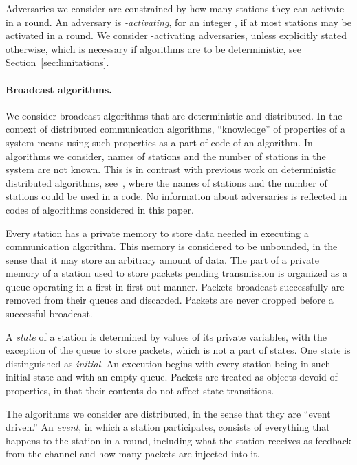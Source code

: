 \documentclass[11pt]{article}
\newcommand{\BBB}{\vspace*{-\bigskipamount}}
\newcommand{\Paragraph}[1]{\BBB\paragraph{#1}}
\begin{document}
Adversaries we consider are constrained by how many stations they can activate in a round.
An adversary is \emph{-activating}, for an integer , if at most  stations may be activated in a round.
We consider -activating adversaries, unless explicitly stated otherwise, which is necessary if algorithms are to be deterministic, see Section~\ref{sec:limitations}.




\Paragraph{Broadcast algorithms.}




We consider  broadcast algorithms that are deterministic and distributed.
In the context of distributed communication algorithms,  ``knowledge'' of properties of a system means using such properties as a part of code of an algorithm.
In algorithms we consider, names of stations and the number of stations in the system are not known.
This is in contrast with previous work on deterministic distributed algorithms, see~\cite{AnantharamuCKR-INFOCOM10, AnantharamuCKR-SIROCCO11, AnantharamuCR-OPODIS09, ChlebusKR09, ChlebusKR-TALG12}, where the names of stations and the number of stations could be used in a code.
No information about adversaries is reflected in codes of algorithms considered in this paper.



Every station has a private memory to store data needed in executing a communication algorithm.
This memory is considered to be unbounded, in the sense that it may store an arbitrary amount of data.
The part of a private memory of a station used to store packets pending transmission is organized as a queue operating  in a first-in-first-out manner.
Packets broadcast successfully are removed from their queues and discarded.
Packets are never dropped before a successful broadcast.

A \emph{state} of a station is determined by  values of its private variables, with the exception of  the queue to store packets, which is not a part of states.
One state is distinguished as \emph{initial}.
An execution begins with every station being in such initial state and with an empty queue.  
Packets are treated as objects devoid of properties, in that their contents do not affect state transitions.

The algorithms we consider are distributed, in the sense that they are ``event driven.''
An \emph{event}, in which a station participates, consists of everything that happens to the station in a round, including what the station receives as feedback from the channel and how many packets are injected into it.
\end{document}
